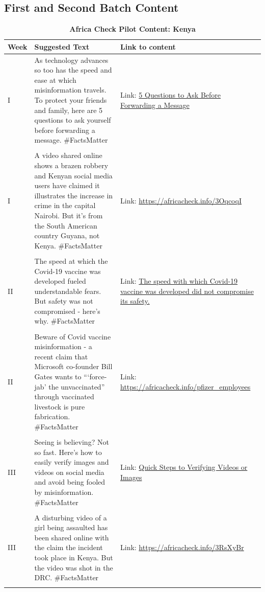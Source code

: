 \subsection{First and Second Batch Content}
\label{app:pilot_content}
\begin{table}[ht]
		\centering
		\caption{\textbf{Africa Check Pilot Content: Kenya \label{tab:KE_1}}} 
		\begin{tabular}{|p{1cm}|p{7cm}|p{5cm}|}
			\hline
			Week & Suggested Text & Link to content \\ 
			\hline
			I & As technology advances so too has the speed and ease at which misinformation travels. To protect your friends and family, here are 5 questions to ask yourself before forwarding a message.      
            \#FactsMatter & Link: \href{https://www.dropbox.com/s/5gsfwz4tkv68q68/Africa_Check_message.mp4?dl=0}{5 Questions to Ask Before Forwarding a Message} \\ &  &\\
            I & A video shared online shows a brazen robbery and Kenyan social media users have claimed it illustrates the increase in crime in the capital Nairobi. But it’s from the South American country Guyana, not Kenya.                      
            \#FactsMatter & 
            Link: \url{https://africacheck.info/3OqcoqI}  \\ &  &\\
            II & The speed at which the Covid-19 vaccine was developed fueled understandable fears. But safety was not compromised - here’s why. \#FactsMatter & Link: \href{https://www.dropbox.com/s/qdm1q17izyxiwyl/Africa_Check_vaccine.mp4?dl=0}{The speed with which Covid-19 vaccine was developed did not compromise its safety.} \\ &  &\\
            II & Beware of Covid vaccine misinformation - a recent claim that Microsoft co-founder Bill Gates wants to “‘force-jab’ the unvaccinated” through vaccinated livestock is pure fabrication.  \#FactsMatter & Link: \url{https://africacheck.info/pfizer_employees} \\ &  &\\
            III & Seeing is believing? Not so fast. Here’s how to easily verify images and videos on social media and avoid being fooled by misinformation. \#FactsMatter & Link: \href{https://www.dropbox.com/s/kujk6fdjgasbkry/Africa_Check_youtube_image_220.mp4?dl=0}{Quick Steps to Verifying Videos or Images} \\ &  &\\
            III & A disturbing video of a girl being assaulted has been shared online with the claim the incident took place in Kenya. But the video was shot in the DRC. \#FactsMatter & Link: \url{https://africacheck.info/3RsXyBr} \\ &  &\\
            
   \hline
		\end{tabular}
  \end{table}

